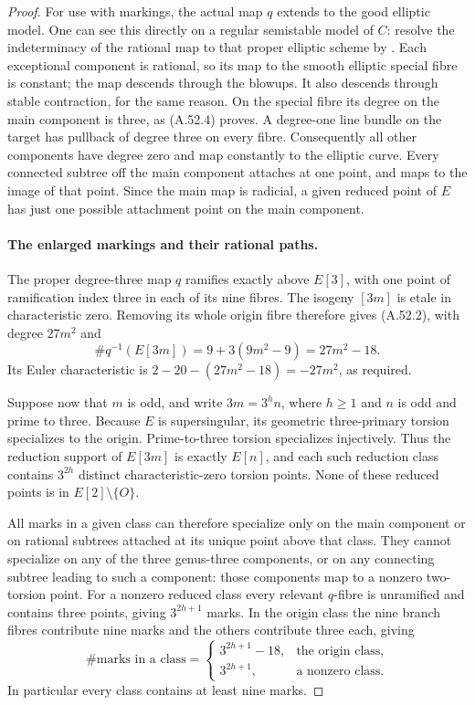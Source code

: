 \begin{proof}
For use with markings, the actual map \(q\) extends to the good
elliptic model. One can see this directly on a regular semistable
model of \(C\): resolve the indeterminacy of the rational map to
that proper elliptic scheme by \cite[Theorem 9.2.7, pp.~396--397]{fghLiu}. Each exceptional component is rational,
so its map to the smooth elliptic special fibre is constant; the map
descends through the blowups. It also descends through stable
contraction, for the same reason. On the special fibre its degree on
the main component is three, as (A.52.4) proves. A degree-one line
bundle on the target has pullback of degree three on every fibre.
Consequently all other components have degree zero and map constantly
to the elliptic curve. Every connected subtree off the main component
attaches at one point, and maps to the image of that point. Since the
main map is radicial, a given reduced point of \(E\) has just one
possible attachment point on the main component.

\paragraph{The enlarged markings and their rational paths.}
The proper degree-three map \(q\) ramifies exactly above \(E[3]\),
with one point of ramification index three in each of its nine fibres.
The isogeny \([3m]\) is etale in characteristic zero. Removing its
whole origin fibre therefore gives (A.52.2), with degree \(27m^2\)
and
\[
        \#q^{-1}(E[3m])=9+3(9m^2-9)=27m^2-18.       \tag{A.52.5}
\]
Its Euler characteristic is \(2-20-(27m^2-18)=-27m^2\), as required.

Suppose now that \(m\) is odd, and write
\(3m=3^h n\), where \(h\ge1\) and \(n\) is odd and prime to
three. Because \(E\) is supersingular, its geometric three-primary
torsion specializes to the origin. Prime-to-three torsion specializes
injectively. Thus the reduction support of \(E[3m]\) is exactly
\(E[n]\), and each such reduction class contains \(3^{2h}\)
distinct characteristic-zero torsion points. None of these reduced
points is in \(E[2]\setminus\{O\}\).

All marks in a given class can therefore specialize only on the main
component or on rational subtrees attached at its unique point above
that class. They cannot specialize on any of the three genus-three
components, or on any connecting subtree leading to such a component:
those components map to a nonzero two-torsion point. For a nonzero
reduced class every relevant \(q\)-fibre is unramified and contains
three points, giving \(3^{2h+1}\) marks. In the origin class the
nine branch fibres contribute nine marks and the others contribute
three each, giving
\[
 \#\text{marks in a class}=
 \begin{cases}
    3^{2h+1}-18,&\text{the origin class},\\
    3^{2h+1},&\text{a nonzero class}.
 \end{cases}                                                   \tag{A.52.6}
\]
In particular every class contains at least nine marks.


\end{proof}
